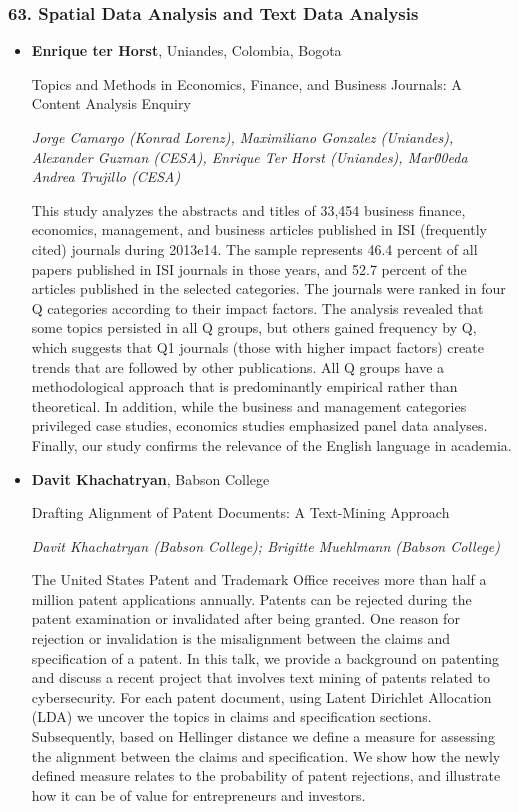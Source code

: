 \subsubsection*{63. Spatial Data Analysis and Text Data Analysis}

\begin{itemize}
\item \textbf{Enrique ter Horst}, Uniandes, Colombia, Bogota

Topics and Methods in Economics, Finance, and Business Journals: A Content Analysis Enquiry

\emph{\footnotesize Jorge Camargo (Konrad Lorenz), Maximiliano Gonzalez (Uniandes), Alexander Guzman (CESA), Enrique Ter Horst (Uniandes), Mar\u00eda Andrea Trujillo (CESA)}

This study analyzes the abstracts and titles of 33,454 business finance, economics, management, and business articles published in ISI (frequently cited) journals during 2013e14. The sample represents 46.4 percent of all papers published in ISI journals in those years, and 52.7 percent of the articles published in the selected categories. The journals were ranked in four Q categories according to their impact factors. The analysis revealed that some topics persisted in all Q groups, but others gained frequency by Q, which suggests that Q1 journals (those with higher impact factors) create trends that are followed by other publications. All Q groups have a methodological approach that is predominantly empirical rather than theoretical. In addition, while the business and management categories privileged case studies, economics studies emphasized panel data analyses. Finally, our study confirms the relevance of the English language in academia.

\item \textbf{Davit Khachatryan}, Babson College

Drafting Alignment of Patent Documents: A Text-Mining Approach

\emph{\footnotesize Davit Khachatryan (Babson College); Brigitte Muehlmann (Babson College)}

The United States Patent and Trademark Office receives more than half a million patent applications annually. Patents can be rejected during the patent examination or invalidated after being granted. One reason for rejection or invalidation is the misalignment between the claims and specification of a patent. In this talk, we provide a background on patenting and discuss a recent project that involves text mining of patents related to cybersecurity. For each patent document, using Latent Dirichlet Allocation (LDA) we uncover the topics in claims and specification sections. Subsequently, based on Hellinger distance we define a measure for assessing the alignment between the claims and specification. We show how the newly defined measure relates to the probability of patent rejections, and illustrate how it can be of value for entrepreneurs and investors.


\end{itemize}
